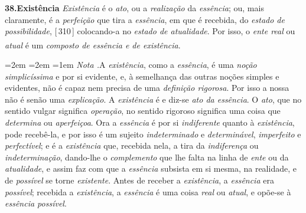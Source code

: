 \documentclass[12pt,a4paper]{article}
\newcommand{\pg}[1]{\thinspace\textup{[\,#1\,]}\thinspace}
\newcommand{\tese}[2]{\bigskip\noindent\textbf{#1.\quad #2}\;\textemdash\;}
\renewcommand\footnote[1]{%
    \stepcounter{footnote}\textsuperscript{\thefootnote}%
    \par
    {\footnotesize
     \leftskip=2em \rightskip=2em \parindent=1em
     \addvspace{\medskipamount}%
     \noindent\textit{Nota \thefootnote.}\enspace #1\par
     \addvspace{\medskipamount}}%
  }
\begin{document}
\tese{38}{Existência} \emph{Existência} é o \emph{ato}, ou a \emph{realização}
da \emph{essência}; ou, mais claramente, é a \emph{perfeição} que tira a
\emph{essência}, em que é recebida, do \emph{estado de possibilidade},
\pg{310} colocando-a no \emph{estado de atualidade}. \textemdash{} Por isso, o
\emph{ente real} ou \emph{atual} é um \emph{composto de essência e de
existência}.\footnote{A \emph{existência}, como a \emph{essência}, é uma
\emph{noção simplicíssima} e por si evidente, e, à semelhança das outras noções
simples e evidentes, não é capaz nem precisa de uma \emph{definição rigorosa}.
Por isso a nossa não é senão uma \emph{explicação}. \textemdash{} A
\emph{existência} é e diz-se \emph{ato da essência}. O \emph{ato}, que
\textemdash{} no sentido vulgar significa \emph{operação}, \textemdash{} no
sentido rigoroso significa uma coisa que \emph{determina} ou \emph{aperfeiçoa}.
Ora a \emph{essência} é por si \emph{indiferente} quanto à \emph{existência},
pode recebê-la, e por isso é um sujeito \emph{indeterminado} e
\emph{determinável}, \emph{imperfeito} e \emph{perfectível}; e é a
\emph{existência} que, recebida nela, a tira da \emph{indiferença} ou
\emph{indeterminação}, dando-lhe o \emph{complemento} que lhe falta na linha de
\emph{ente} ou da \emph{atualidade}, e assim faz com que a \emph{essência}
subsista em si mesma, na realidade, e de \emph{possível} se torne
\emph{existente}. Antes de receber a \emph{existência}, a \emph{essência} era
\emph{possível}; recebida a \emph{existência}, a \emph{essência} é uma coisa
\emph{real} ou \emph{atual}, e opõe-se à \emph{essência possível}.

}
\end{document}
